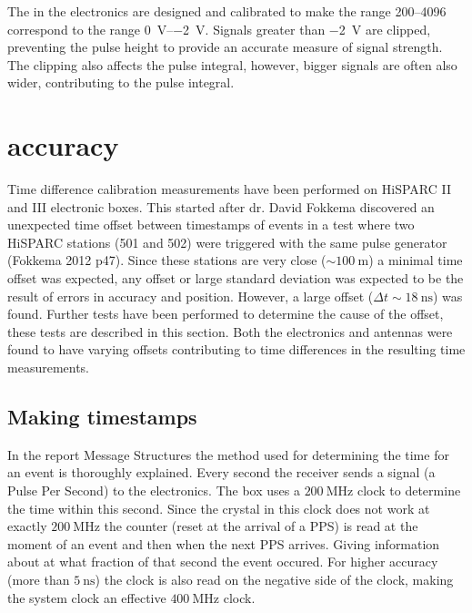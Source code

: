 The \adcs in the \hisparc electronics are designed and calibrated to
make the range \SIrange{200}{4096}{\Adc} correspond to the range
\SIrange{0}{-2}{\volt}. Signals greater than \SI{-2}{\volt} are clipped,
preventing the pulse height to provide an accurate measure of signal
strength. The clipping also affects the pulse integral, however, bigger
signals are often also wider, contributing to the pulse integral.



\section{\gps accuracy}
\label{sec:gps_accuracy}

Time difference calibration measurements have been performed on
HiSPARC II and III electronic boxes. This started after dr. David
Fokkema discovered an unexpected time offset between timestamps of
events in a test where two HiSPARC stations (501 and 502) were triggered
with the same pulse generator (Fokkema 2012 p47). Since these stations
are very close ($\sim\SI{100}{\meter}$) a minimal time offset was
expected, any offset or large standard deviation was expected to be the
result of errors in \gps accuracy and position. However, a large offset
($\Delta t \sim\SI{18}{\nano\second}$) was found. Further tests have
been performed to determine the cause of the offset, these tests are
described in this section. Both the \hisparc electronics and \gps
antennas were found to have varying offsets contributing to time
differences in the resulting time measurements.


\subsection{Making timestamps}
\label{sub:gps_timestamps}

In the report Message Structures \hisparc the method used for
determining the time for an event is thoroughly explained. Every second
the \gps receiver sends a signal (a Pulse Per Second) to the \hisparc
electronics. The \hisparc box uses a $\SI{200}{\mega\hertz}$ clock to
determine the time within this second. Since the crystal in this clock
does not work at exactly $\SI{200}{\mega\hertz}$ the counter (reset at
the arrival of a PPS) is read at the moment of an event and then when
the next PPS arrives. Giving information about at what fraction of that
second the event occured. For higher accuracy (more than
$\SI{5}{\nano\second}$) the clock is also read on the negative side of
the clock, making the system clock an effective
$\SI{400}{\mega\hertz}$ clock.

